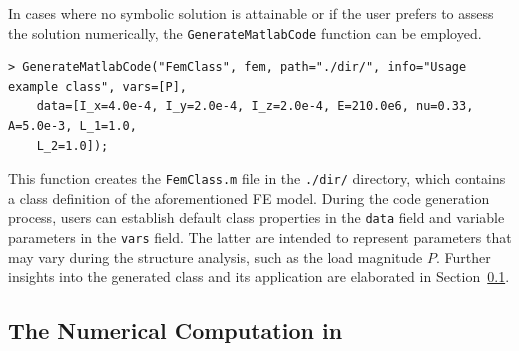 In cases where no symbolic solution is attainable or if the user prefers to assess the solution numerically, the \texttt{GenerateMatlabCode} function can be employed.
%
\begin{verbatim}
> GenerateMatlabCode("FemClass", fem, path="./dir/", info="Usage example class", vars=[P],
    data=[I_x=4.0e-4, I_y=2.0e-4, I_z=2.0e-4, E=210.0e6, nu=0.33, A=5.0e-3, L_1=1.0,
    L_2=1.0]);
\end{verbatim}
%
This function creates the \texttt{FemClass.m} file in the \texttt{./dir/} directory, which contains a class definition of the aforementioned \ac{FE} model. During the code generation process, users can establish default class properties in the \texttt{data} field and variable parameters in the \texttt{vars} field. The latter are intended to represent parameters that may vary during the structure analysis, such as the load magnitude $P$. Further insights into the generated class and its application are elaborated in Section~\ref{chap5:subsec:numerical_computation}.

\subsection{The Numerical Computation in \Matlab{}}
\label{chap5:subsec:numerical_computation}

